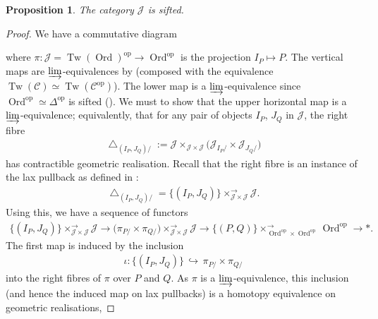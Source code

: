 \documentclass[12pt, reqno]{amsart}
\theoremstyle{plain}
\newtheorem{proposition}[theorem]{Proposition}
\theoremstyle{definition}
\begin{document}
\begin{proposition}\label{J is sifted}
The category $\mathcal{J}$ is sifted.
\end{proposition}
\begin{proof}
We have a commutative diagram
\begin{center}
\end{center}
where $\pi\colon \mathcal{J}=\operatorname{Tw}(\operatorname{Ord})^{\operatorname{op}}\rightarrow \operatorname{Ord}^{\operatorname{op}}$ is the projection $I_P\mapsto P$. The vertical maps are $\varinjlim$-equivalences by \cite[Lemma 4.16]{ClausenOrsnesJansen} (composed with the equivalence $\operatorname{Tw}(\mathcal{C})\simeq \operatorname{Tw}(\mathcal{C}^{\operatorname{op}})$). The lower map is a $\varinjlim$-equivalence since $\operatorname{Ord}^{\operatorname{op}}\simeq \Delta^{\operatorname{op}}$ is sifted (\cite[5.5.8.4]{LurieHTT}). We must to show that the upper horizontal map is a $\varinjlim$-equivalence; equivalently, that for any pair of objects $I_P$, $J_Q$ in $\mathcal{J}$, the right fibre
\begin{align*}
\bigtriangleup_{(I_P,J_Q)/}:=\mathcal{J}\mathop{\times}_{\mathcal{J}\times \mathcal{J}} \big(\mathcal{J}_{I_P/}\times \mathcal{J}_{J_Q/}\big)
\end{align*}
has contractible geometric realisation. Recall that the right fibre is an instance of the lax pullback as defined in \cite{Tamme}:
\begin{align*}
\bigtriangleup_{(I_P,J_Q)/}=\{(I_P,J_Q)\}\mathop{\times}^{\rightarrow}_{\mathcal{J}\times \mathcal{J}} \mathcal{J}.
\end{align*}
Using this, we have a sequence of functors
\begin{align}\label{sequence of functors}
\{(I_P,J_Q)\}\mathop{\times}^{\rightarrow}_{\mathcal{J}\times \mathcal{J}} \mathcal{J}\longrightarrow \big( \pi_{P/}\times \pi_{Q/}\big)\mathop{\times}^{\rightarrow}_{\mathcal{J}\times \mathcal{J}} \mathcal{J}\longrightarrow \{(P,Q)\}\mathop{\times}^{\rightarrow}_{\operatorname{Ord}^{\operatorname{op}}\times \operatorname{Ord}^{\operatorname{op}}} \operatorname{Ord}^{\operatorname{op}}\longrightarrow \ast.
\end{align}
The first map is induced by the inclusion
\begin{align*}
\iota\colon \{(I_P,J_Q)\}\,\hookrightarrow \,\pi_{P/}\times \pi_{Q/}
\end{align*}
into the right fibres of $\pi$ over $P$ and $Q$. As $\pi$ is a $\varinjlim$-equivalence, this inclusion (and hence the induced map on lax pullbacks) is a homotopy equivalence on geometric realisations, 


\end{proof}
\end{document}
